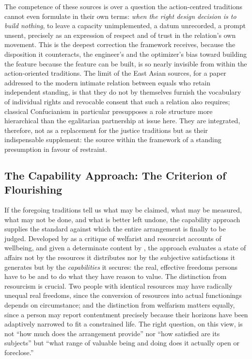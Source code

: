 The competence of these sources is over a question the action-centred traditions cannot even formulate in their own terms: \emph{when the right design decision is to build nothing}, to leave a capacity unimplemented, a datum unrecorded, a prompt unsent, precisely as an expression of respect and of trust in the relation's own movement. This is the deepest correction the framework receives, because the disposition it counteracts, the engineer's and the optimizer's bias toward building the feature because the feature can be built, is so nearly invisible from within the action-oriented traditions. The limit of the East Asian sources, for a paper addressed to the modern intimate relation between equals who retain independent standing, is that they do not by themselves furnish the vocabulary of individual rights and revocable consent that such a relation also requires; classical Confucianism in particular presupposes a role structure more hierarchical than the egalitarian partnership at issue here. They are integrated, therefore, not as a replacement for the justice traditions but as their indispensable supplement: the source within the framework of a standing presumption in favour of restraint.

\subsection{The Capability Approach: The Criterion of Flourishing}\label{p01:sec:capability}

If the foregoing traditions tell us what may be claimed, what may be measured, what may not be done, and what is better left undone, the capability approach supplies the standard against which the entire arrangement is finally to be judged. Developed by \textcite{sen1999development} as a critique of welfarist and resourcist accounts of wellbeing, and given a determinate content by \textcite{nussbaum2000women}, the approach evaluates a state of affairs not by the resources it distributes nor by the subjective satisfactions it generates but by the \emph{capabilities} it secures: the real, effective freedoms persons have to be and to do what they have reason to value. The distinction from resourcism is crucial. Two people with identical resources may have radically unequal real freedoms, since the conversion of resources into actual functionings depends on circumstance; and the distinction from welfarism matters equally, since a person may report contentment precisely because their horizons have been adaptively narrowed to fit a constrained life. The right question, on this view, is not ``how much does the arrangement provide'' nor ``how satisfied are its subjects'' but ``what range of valuable being and doing does it actually open or foreclose.''

